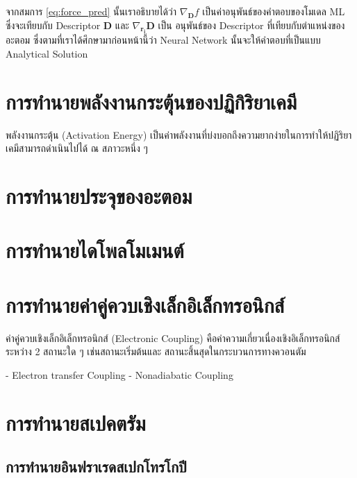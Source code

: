 จากสมการ \ref{eq:force_pred} นั้นเราอธิบายได้ว่า $\nabla_{\mathbf{D}} f$ เป็นค่าอนุพันธ์ของคำตอบของโมเดล ML ซึ่งจะเทียบกับ
Descriptor $\mathbf{D}$ และ $\nabla_{\mathbf{r_i}} \mathbf{D}$ เป็น อนุพันธ์ของ Descriptor ที่เทียบกับตำแหน่งของอะตอม
ซึ่งตามที่เราได้ศึกษามาก่อนหน้านี้ว่า Neural Network นั้นจะให้คำตอบที่เป็นแบบ Analytical Solution

\section{การทำนายพลังงานกระตุ้นของปฏิกิริยาเคมี}

พลังงานกระตุ้น (Activation Energy) เป็นค่าพลังงานที่บ่งบอกถึงความยากง่ายในการทำให้ปฏิริยาเคมีสามารถดำเนินไปได้ ณ สภาวะหนึ่ง ๆ

\section{การทำนายประจุของอะตอม}

\section{การทำนายไดโพลโมเมนต์}

\section{การทำนายค่าคู่ควบเชิงเล็กอิเล็กทรอนิกส์}

ค่าคู่ควบเชิงเล็กอิเล็กทรอนิกส์ (Electronic Coupling) คือค่าความเกี่ยวเนื่องเชิงอิเล็กทรอนิกส์ระหว่าง 2 สถานะใด ๆ เช่นสถานะเริ่มต้นและ%
สถานะสิ้นสุดในกระบวนการทางควอนตัม

- Electron transfer Coupling
- Nonadiabatic Coupling

\section{การทำนายสเปคตรัม}

\subsection{การทำนายอินฟราเรดสเปกโทรโกปี}

